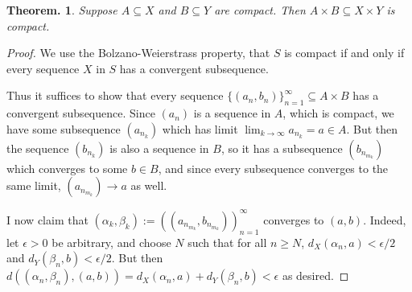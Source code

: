 \documentclass[11pt, a4paper]{memoir}
\theoremstyle{change}
\newtheorem{theorem}{Theorem.}[section]
\theoremstyle{plain}
\theoremstyle{nonumberplain}
\newtheorem{proof}{Proof}
\numberwithin{equation}{section}
\begin{document}
\begin{theorem}
    Suppose $A\subseteq X$ and $B\subseteq Y$ are compact.
    Then $A\times B\subseteq X\times Y$ is compact.
\end{theorem}
\begin{proof}
    We use the Bolzano-Weierstrass property, that $S$ is compact if and only if every sequence $X$ in $S$
    has a convergent subsequence.

    Thus it suffices to show that every sequence $\{(a_n,b_n)\}_{n=1}^\infty\subseteq A\times B$
    has a convergent subsequence. Since $(a_n)$ is a sequence in $A$, which is compact, we have some
    subsequence $(a_{n_k})$ which has limit $\lim_{k\to\infty}a_{n_k}=a\in A$. But then
    the sequence $(b_{n_k})$ is also a sequence in $B$, so it has a subsequence $(b_{n_{m_k}})$ which
    converges to some $b\in B$, and since every subsequence converges to the same limit, $(a_{n_{m_k}})\to a$
    as well.

    I now claim that $(\alpha_k,\beta_k):=((a_{n_{m_k}},b_{n_{m_k}}))_{n=1}^\infty$ converges to $(a,b)$.
    Indeed, let $\epsilon>0$ be arbitrary, and choose $N$ such that for all $n\geq N$, $d_X(\alpha_n,a)<\epsilon/2$
    and $d_Y(\beta_n,b)<\epsilon/2$. But then $d( (\alpha_n,\beta_n),(a,b) )= d_X(\alpha_n,a)+d_Y(\beta_n,b)<\epsilon$
    as desired.
\end{proof}
\end{document}
